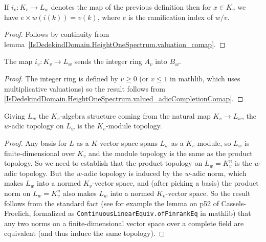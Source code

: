 \begin{lemma}
  \label{IsDedekindDomain.HeightOneSpectrum.valued_adicCompletionComap}
  \leanok
  If $i_v:K_v\to L_w$ denotes the map of the previous definition
  then for $x\in K_v$ we have
  $e\times w(i(k))=v(k)$, where $e$ is the ramification index of $w/v$.
\end{lemma}
\begin{proof}
  \leanok
  Follows by continuity from lemma~\ref{IsDedekindDomain.HeightOneSpectrum.valuation_comap}.
\end{proof}

\begin{theorem}
  \label{IsDedekindDomain.HeightOneSpectrum.adicCompletionComapSemialgHom.mapadicCompletionIntegers}
  \leanok
  The map $i_v:K_v\to L_w$ sends the integer ring $A_v$ into $B_w$.
\end{theorem}
\begin{proof}
  \leanok
  The integer ring is defined by $v\geq0$ (or $v\leq 1$ in mathlib, which uses multiplicative
  valuations) so the result follows from \ref{IsDedekindDomain.HeightOneSpectrum.valued_adicCompletionComap}.
\end{proof}
\begin{theorem}
  \label{IsDedekindDomain.HeightOneSpectrum.adicCompletionComap_isModuleTopology}
  \leanok
  Giving $L_w$ the $K_v$-algebra structure coming from the natural map $K_v\to L_w$,
  the $w$-adic topology on $L_w$ is the $K_v$-module topology.
\end{theorem}
\begin{proof}
  Any basis for $L$ as a $K$-vector space spans $L_w$ as a $K_v$-module, so $L_w$ is
  finite-dimensional over $K_v$ and the module topology is the same as the product
  topology. So we need to establish that the product topology on $L_w=K_v^n$ is
  the $w$-adic topology. But the $w$-adic topology is induced by the $w$-adic norm,
  which makes $L_w$ into a normed $K_v$-vector space, and (after picking a basis)
  the product norm on $L_w=K_v^n$ also makes $L_w$ into a normed $K_v$-vector space.
  So the result follows from the standard fact (see for example the lemma on p52
  of Cassels-Froelich, formalized as {\tt ContinuousLinearEquiv.ofFinrankEq} in mathlib)
  that any two norms on a finite-dimensional vector space over
  a complete field are equivalent (and thus induce the same topology).
\end{proof}

